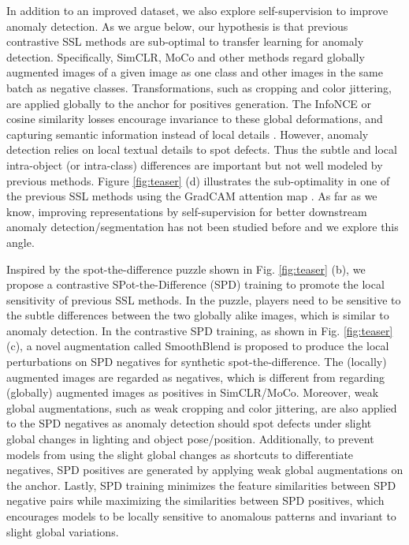 In addition to an improved dataset, we also explore self-supervision to improve anomaly detection. As we argue below, our hypothesis is that previous contrastive SSL methods \cite{chen2020simple,chen2021exploring,he2020momentum} are sub-optimal to transfer learning for anomaly detection. Specifically, SimCLR, MoCo and other methods regard globally augmented images of a given image as one class and other images in the same batch as negative classes. Transformations, such as cropping and color jittering, are applied globally to the anchor for positives generation. The InfoNCE or cosine similarity losses \cite{chen2020simple,chen2021exploring,he2020momentum} encourage invariance to these global deformations, and capturing semantic information instead of local details \cite{geirhos2020on}. However, anomaly detection relies on local textual details to spot defects. Thus the subtle and local intra-object (or intra-class) differences are important but not well modeled by previous methods. Figure \ref{fig:teaser} (d) illustrates the sub-optimality in one of the previous SSL methods using the GradCAM attention map \cite{selvaraju2017grad}. As far as we know, improving representations by self-supervision for better downstream anomaly detection/segmentation has not been studied before and we explore this angle. 

Inspired by the spot-the-difference puzzle shown in Fig. \ref{fig:teaser} (b), we propose a contrastive SPot-the-Difference (SPD) training to promote the local sensitivity of previous SSL methods. In the puzzle, players need to be sensitive to the subtle differences between the two globally alike images, which is similar to anomaly detection. In the contrastive SPD training, as shown in Fig. \ref{fig:teaser} (c), a novel augmentation called SmoothBlend is proposed to produce the local perturbations on SPD negatives for synthetic spot-the-difference. The (locally) augmented images are regarded as negatives, which is different from regarding (globally) augmented images as positives in SimCLR/MoCo. Moreover, weak global augmentations, such as weak cropping and color jittering, are also applied to the SPD negatives as anomaly detection should spot defects under slight global changes in lighting and object pose/position. Additionally, to prevent models from using the slight global changes as shortcuts to differentiate negatives, SPD positives are generated by applying weak global augmentations on the anchor. Lastly, SPD training minimizes the feature similarities between SPD negative pairs while maximizing the similarities between SPD positives, which encourages models to be locally sensitive to anomalous patterns and invariant to slight global variations.

